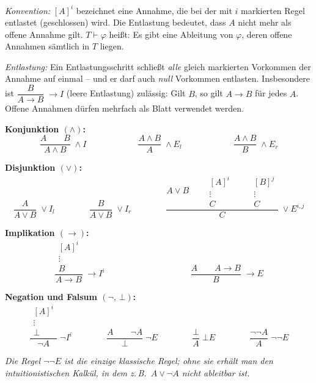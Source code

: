 \textit{Konvention:} $[A]^i$ bezeichnet eine Annahme, die bei der mit $i$ markierten Regel entlastet (geschlossen) wird. Die Entlastung bedeutet, dass $A$ nicht mehr als offene Annahme gilt. $T\vdash\varphi$ heißt: Es gibt eine Ableitung von $\varphi$, deren offene Annahmen sämtlich in $T$ liegen.

\noindent\textit{Entlastung:} Ein Entlastungsschritt schließt \emph{alle} gleich markierten Vorkommen der Annahme auf einmal -- und er darf auch \emph{null} Vorkommen entlasten. Insbesondere ist $\dfrac{B}{A\to B}\;\to I$ (leere Entlastung) zulässig: Gilt $B$, so gilt $A\to B$ für jedes $A$. Offene Annahmen dürfen mehrfach als Blatt verwendet werden.

\medskip
\noindent\textbf{Konjunktion $(\wedge)$:}
\[
\dfrac{A \qquad B}{A \wedge B}\;\wedge I
\qquad\qquad\qquad
\dfrac{A \wedge B}{A}\;\wedge E_l
\qquad\qquad\qquad
\dfrac{A \wedge B}{B}\;\wedge E_r
\]

\medskip
\noindent\textbf{Disjunktion $(\vee)$:}
\[
\dfrac{A}{A \vee B}\;\vee I_l
\qquad\qquad
\dfrac{B}{A \vee B}\;\vee I_r
\qquad\qquad
\dfrac{A \vee B \qquad \begin{array}{c}[A]^i \\ \vdots \\ C\end{array} \qquad \begin{array}{c}[B]^j \\ \vdots \\ C\end{array}}{C}\;\vee E^{i,j}
\]

\medskip
\noindent\textbf{Implikation $(\to)$:}
\[
\dfrac{\begin{array}{c}[A]^i \\ \vdots \\ B\end{array}}{A \to B}\;{\to I^i}
\qquad\qquad\qquad\qquad\qquad
\dfrac{A \qquad A \to B}{B}\;{\to E}
\]

\medskip
\noindent\textbf{Negation und Falsum $(\neg,\, \bot)$:}
\[
\dfrac{\begin{array}{c}[A]^i \\ \vdots \\ \bot\end{array}}{\neg A}\;{\neg I^i}
\qquad\qquad
\dfrac{A \qquad \neg A}{\bot}\;{\neg E}
\qquad\qquad
\dfrac{\bot}{A}\;{\bot E}
\qquad\qquad
\dfrac{\neg\neg A}{A}\;{\neg\neg E}
\]

\noindent\textit{Die Regel $\neg\neg E$ ist die einzige \emph{klassische} Regel; ohne sie erhält man den intuitionistischen Kalkül, in dem z.\,B.\ $A\vee\neg A$ nicht ableitbar ist.}

